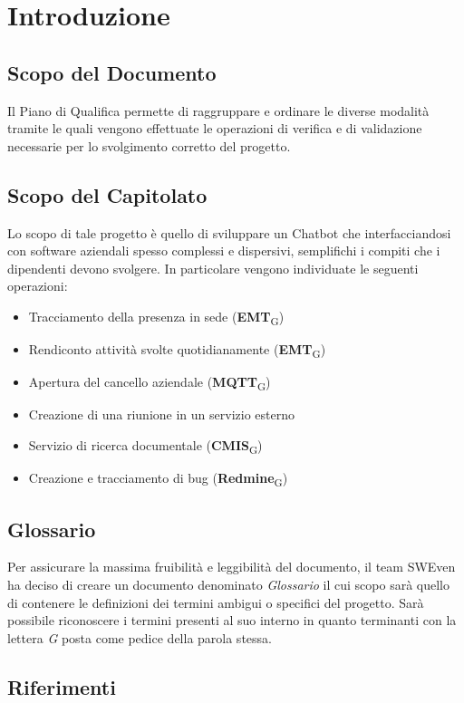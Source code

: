 \section{Introduzione}
\subsection{Scopo del Documento}
Il Piano di Qualifica permette di raggruppare e ordinare le diverse modalità tramite le quali 
vengono effettuate le operazioni di verifica e di validazione necessarie per lo svolgimento corretto 
del progetto.

\subsection{Scopo del Capitolato}
Lo scopo di tale progetto è quello di sviluppare un Chatbot che interfacciandosi con software aziendali spesso complessi e dispersivi, semplifichi i compiti che i dipendenti devono svolgere. In particolare vengono individuate le seguenti operazioni: 
\begin{itemize}
	\item Tracciamento della presenza in sede (\textbf{EMT}\textsubscript{G})
	\item Rendiconto attività svolte quotidianamente (\textbf{EMT}\textsubscript{G})
	\item Apertura del cancello aziendale (\textbf{MQTT}\textsubscript{G})
	\item Creazione di una riunione in un servizio esterno
	\item Servizio di ricerca documentale (\textbf{CMIS}\textsubscript{G})
	\item Creazione e tracciamento di bug (\textbf{Redmine}\textsubscript{G})
\end{itemize}

\subsection{Glossario}
Per assicurare la massima fruibilità e leggibilità del documento, il team SWEven ha deciso di creare un documento denominato \textit{Glossario} il cui scopo sarà quello di contenere le definizioni dei termini ambigui o specifici del progetto. Sarà possibile riconoscere i termini presenti al suo interno in quanto terminanti con la lettera \textit{G} posta come pedice della parola stessa. 
\subsection{Riferimenti}

